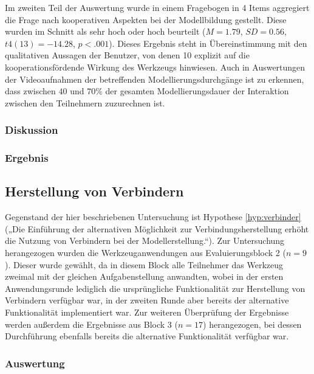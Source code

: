Im zweiten Teil der Auswertung wurde in einem Fragebogen in 4 Items aggregiert die Frage nach kooperativen Aspekten bei der Modellbildung gestellt. Diese wurden im Schnitt als sehr hoch oder hoch beurteilt ($M = 1.79$, $SD = 0.56$, $t4(13) = -14.28$, $p<.001$). Dieses Ergebnis steht in Übereinstimmung mit den qualitativen Aussagen der Benutzer, von denen 10 explizit auf die kooperationsfördende Wirkung des Werkzeugs hinwiesen. Auch in Auswertungen der  Videoaufnahmen der betreffenden Modellierungsdurchgänge ist zu erkennen, dass zwischen $40$ und $70\%$ der gesamten Modellierungsdauer der Interaktion zwischen den Teilnehmern zuzurechnen ist.

\subsubsection{Diskussion} %

\subsubsection{Ergebnis} %


\subsection{Herstellung von Verbindern} %
\label{sub:herstellung_von_verbindern}

Gegenstand der hier beschriebenen Untersuchung ist Hypothese \ref{hyp:verbinder} („Die Einführung der alternativen Möglichkeit zur Verbindungsherstellung erhöht die Nutzung von Verbindern bei der Modellerstellung.“). Zur Untersuchung herangezogen wurden die Werkzeuganwendungen aus Evaluierungsblock 2 ($n=9$). Dieser wurde gewählt, da in diesem Block alle Teilnehmer das Werkzeug zweimal mit der gleichen Aufgabenstellung anwandten, wobei in der ersten Anwendungsrunde lediglich die ursprüngliche Funktionalität zur Herstellung von Verbindern verfügbar war, in der zweiten Runde aber bereits der alternative Funktionalität implementiert war. Zur weiteren Überprüfung der Ergebnisse werden außerdem die Ergebnisse aus Block 3 ($n=17$) herangezogen, bei dessen Durchführung ebenfalls bereits die alternative Funktionalität verfügbar war.

\subsubsection{Auswertung} %

